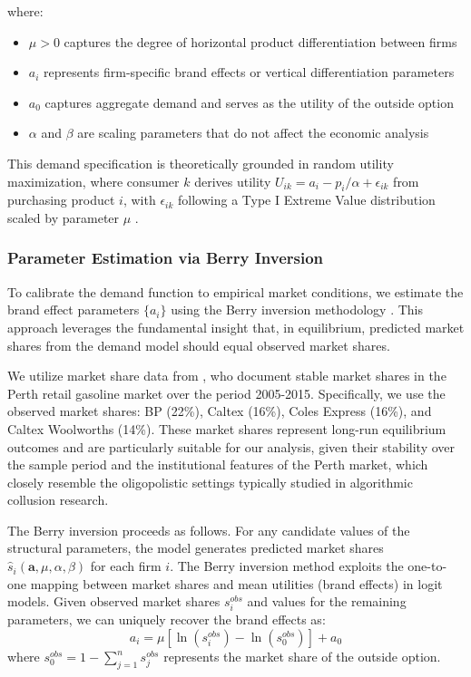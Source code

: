 where:
\begin{itemize}
    \item $\mu > 0$ captures the degree of horizontal product differentiation between firms
    \item $a_i$ represents firm-specific brand effects or vertical differentiation parameters
    \item $a_0$ captures aggregate demand and serves as the utility of the outside option
    \item $\alpha$ and $\beta$ are scaling parameters that do not affect the economic analysis
\end{itemize}

This demand specification is theoretically grounded in random utility maximization, where consumer $k$ derives utility $U_{ik} = a_i - p_i/\alpha + \epsilon_{ik}$ from purchasing product $i$, with $\epsilon_{ik}$ following a Type I Extreme Value distribution scaled by parameter $\mu$ \parencite{berry_estimating_1994, train_discrete_2009}.

\subsubsection*{Parameter Estimation via Berry Inversion}

To calibrate the demand function to empirical market conditions, we estimate the brand effect parameters $\{a_i\}$ using the Berry inversion methodology \parencite{berry_estimating_1994}. This approach leverages the fundamental insight that, in equilibrium, predicted market shares from the demand model should equal observed market shares.

We utilize market share data from \textcite{byrne_learning_2019}, who document stable market shares in the Perth retail gasoline market over the period 2005-2015. Specifically, we use the observed market shares: BP (22\%), Caltex (16\%), Coles Express (16\%), and Caltex Woolworths (14\%). These market shares represent long-run equilibrium outcomes and are particularly suitable for our analysis, given their stability over the sample period and the institutional features of the Perth market, which closely resemble the oligopolistic settings typically studied in algorithmic collusion research.

The Berry inversion proceeds as follows. For any candidate values of the structural parameters, the model generates predicted market shares $\hat{s}_i(\boldsymbol{a}, \mu, \alpha, \beta)$ for each firm $i$. The Berry inversion method exploits the one-to-one mapping between market shares and mean utilities (brand effects) in logit models. Given observed market shares $s_i^{obs}$ and values for the remaining parameters, we can uniquely recover the brand effects as:
\begin{equation}
    a_i = \mu \left[ \ln(s_i^{obs}) - \ln(s_0^{obs}) \right] + a_0
\end{equation}
where $s_0^{obs} = 1 - \sum_{j=1}^{n} s_j^{obs}$ represents the market share of the outside option.

